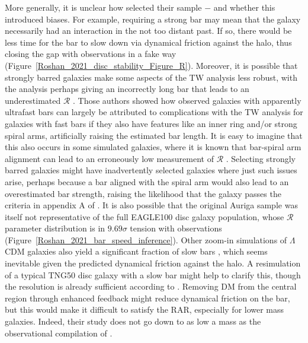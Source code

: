 \documentclass[fleqn,usenatbib,useAMS,onecolumn]{mnras} %
\begin{document}
More generally, it is unclear how \citet{Fragkoudi_2021} selected their sample $-$ and whether this introduced biases. For example, requiring a strong bar may mean that the galaxy necessarily had an interaction in the not too distant past. If so, there would be less time for the bar to slow down via dynamical friction against the halo, thus closing the gap with observations in a fake way (Figure~\ref{Roshan_2021_disc_stability_Figure_R}). Moreover, it is possible that strongly barred galaxies make some aspects of the TW analysis less robust, with the analysis perhaps giving an incorrectly long bar that leads to an underestimated $\mathcal{R}$ \citep{Cuomo_2021}. Those authors showed how observed galaxies with apparently ultrafast bars can largely be attributed to complications with the TW analysis for galaxies with fast bars if they also have features like an inner ring and/or strong spiral arms, artificially raising the estimated bar length. It is easy to imagine that this also occurs in some simulated galaxies, where it is known that bar-spiral arm alignment can lead to an erroneously low measurement of $\mathcal{R}$ \citep{Hilmi_2020}. Selecting strongly barred galaxies might have inadvertently selected galaxies where just such issues arise, perhaps because a bar aligned with the spiral arm would also lead to an overestimated bar strength, raising the likelihood that the galaxy passes the criteria in appendix A of \citet{Fragkoudi_2021}. It is also possible that the original Auriga sample was itself not representative of the full EAGLE100 disc galaxy population, whose $\mathcal{R}$ parameter distribution is in $9.69\sigma$ tension with observations (Figure~\ref{Roshan_2021_bar_speed_inference}). Other zoom-in simulations of $\Lambda$CDM galaxies also yield a significant fraction of slow bars \citep[e.g.][]{Zana_2018, Zana_2019}, which seems inevitable given the predicted dynamical friction against the halo. A resimulation of a typical TNG50 disc galaxy with a slow bar might help to clarify this, though the resolution is already sufficient according to \citet{Fragkoudi_2021}. Removing DM from the central region through enhanced feedback might reduce dynamical friction on the bar, but this would make it difficult to satisfy the RAR, especially for lower mass galaxies. Indeed, their study does not go down to as low a mass as the observational compilation of \citet{Cuomo_2020}.
\end{document}
